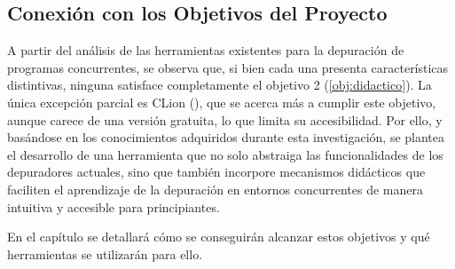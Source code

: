 
\subsection{Conexión con los Objetivos del Proyecto}{\label{subsec:conexión-objetivos-proyecto}}

A partir del análisis de las herramientas existentes para la depuración de programas concurrentes, se observa que, si bien cada una presenta características distintivas, ninguna satisface completamente el objetivo 2 (\ref{obj:didactico}). La única excepción parcial es CLion (), que se acerca más a cumplir este objetivo, aunque carece de una versión gratuita, lo que limita su accesibilidad. Por ello, y basándose en los conocimientos adquiridos durante esta investigación, se plantea el desarrollo de una herramienta que no solo abstraiga las funcionalidades de los depuradores actuales, sino que también incorpore mecanismos didácticos que faciliten el aprendizaje de la depuración en entornos concurrentes de manera intuitiva y accesible para principiantes.

En el capítulo  se detallará cómo se conseguirán alcanzar estos objetivos y qué herramientas se utilizarán para ello.


